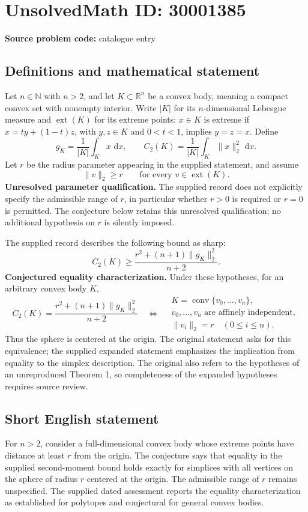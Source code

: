 \documentclass[11pt]{article}
\newcommand{\N}{\mathbb{N}}
\newcommand{\R}{\mathbb{R}}
\newcommand{\dd}{\,\mathrm{d}}
\begin{document}
\section*{UnsolvedMath ID: 30001385}
\textbf{Source problem code:} catalogue entry
\subsection{Definitions and mathematical statement}
Let \(n\in\N\) with \(n>2\), and let \(K\subset\R^n\) be a convex body, meaning a compact convex set with nonempty interior. Write \(|K|\) for its \(n\)-dimensional Lebesgue measure and \(\operatorname{ext}(K)\) for its extreme points: \(x\in K\) is extreme if \(x=ty+(1-t)z\), with \(y,z\in K\) and \(0<t<1\), implies \(y=z=x\). Define
\[
 g_K=\frac{1}{|K|}\int_K x\,\dd x,
 \qquad C_2(K)=\frac{1}{|K|}\int_K\|x\|_2^2\,\dd x.
\]
Let \(r\) be the radius parameter appearing in the supplied statement, and assume
\[
 \|v\|_2\ge r\qquad\text{for every }v\in\operatorname{ext}(K).
\]
\textbf{Unresolved parameter qualification.} The supplied record does not explicitly specify the admissible range of \(r\), in particular whether \(r>0\) is required or \(r=0\) is permitted. The conjecture below retains this unresolved qualification; no additional hypothesis on \(r\) is silently imposed.

The supplied record describes the following bound as sharp:
\[
 C_2(K)\ge\frac{r^2+(n+1)\|g_K\|_2^2}{n+2}.
\]
\textbf{Conjectured equality characterization.} Under these hypotheses, for an arbitrary convex body \(K\),
\[
 C_2(K)=\frac{r^2+(n+1)\|g_K\|_2^2}{n+2}
 \quad\Longleftrightarrow\quad
 \begin{gathered}
 K=\operatorname{conv}\{v_0,\ldots,v_n\},\\
 v_0,\ldots,v_n\text{ are affinely independent},\\
 \|v_i\|_2=r\quad(0\le i\le n).
 \end{gathered}
\]
Thus the sphere is centered at the origin. The original statement asks for this equivalence; the supplied expanded statement emphasizes the implication from equality to the simplex description. The original also refers to the hypotheses of an unreproduced Theorem 1, so completeness of the expanded hypotheses requires source review.
\subsection{Short English statement}
For \(n>2\), consider a full-dimensional convex body whose extreme points have distance at least \(r\) from the origin. The conjecture says that equality in the supplied second-moment bound holds exactly for simplices with all vertices on the sphere of radius \(r\) centered at the origin. The admissible range of \(r\) remains unspecified. The supplied dated assessment reports the equality characterization as established for polytopes and conjectural for general convex bodies.
\end{document}
